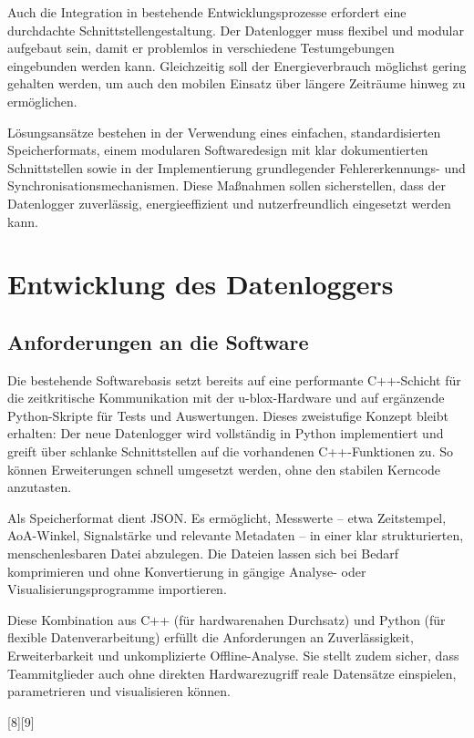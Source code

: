 \documentclass[a4paper, 12pt]{article} %
\begin{document}
Auch die Integration in bestehende Entwicklungsprozesse erfordert eine durchdachte Schnittstellengestaltung.
 Der Datenlogger muss flexibel und modular aufgebaut sein, damit er problemlos in verschiedene Testumgebungen 
 eingebunden werden kann. Gleichzeitig soll der Energieverbrauch möglichst gering gehalten werden, um auch den mobilen Einsatz über längere
  Zeiträume hinweg zu ermöglichen.

Lösungsansätze bestehen in der Verwendung eines einfachen, standardisierten Speicherformats, einem modularen 
Softwaredesign mit klar dokumentierten Schnittstellen sowie in der Implementierung grundlegender Fehlererkennungs- und Synchronisationsmechanismen. 
Diese Maßnahmen sollen sicherstellen, dass der Datenlogger zuverlässig, energieeffizient und nutzerfreundlich eingesetzt werden kann.

\clearpage

\section{Entwicklung des Datenloggers}
\subsection{Anforderungen an die Software}
Die bestehende Softwarebasis setzt bereits auf eine performante C++-Schicht für die zeitkritische Kommunikation mit 
der u-blox-Hardware und auf ergänzende Python-Skripte für Tests und Auswertungen. Dieses zweistufige Konzept bleibt erhalten: 
Der neue Datenlogger wird vollständig in Python implementiert und greift über schlanke Schnittstellen auf die vorhandenen C++-Funktionen zu. 
So können Erweiterungen schnell umgesetzt werden, ohne den stabilen Kerncode anzutasten.

Als Speicherformat dient JSON. Es ermöglicht, Messwerte – etwa Zeitstempel, AoA-Winkel, Signalstärke und relevante Metadaten – in einer 
klar strukturierten, menschenlesbaren Datei abzulegen. Die Dateien lassen sich bei Bedarf komprimieren und ohne Konvertierung in gängige 
Analyse- oder Visualisierungsprogramme importieren.

Diese Kombination aus C++ (für hardwarenahen Durchsatz) und Python (für flexible Daten­verarbeitung) erfüllt die Anforderungen 
an Zuverlässigkeit, Erweiterbarkeit und unkomplizierte Offline-Analyse. Sie stellt zudem sicher, dass Teammitglieder auch ohne direkten 
Hardwarezugriff reale Datensätze einspielen, parametrieren und visualisieren können.

[8][9]
\end{document}
